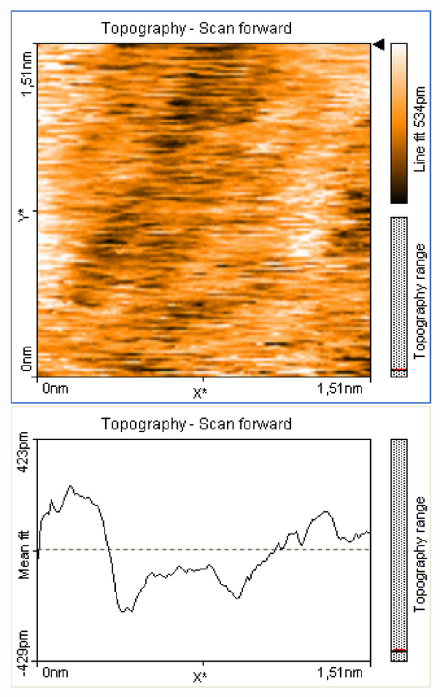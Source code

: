 \documentclass[12pt]{article}
\begin{document}
\begin{figure}[H]  
\begin{minipage}{0.4\linewidth}
\centering
\includegraphics[width=0.9\linewidth]{../plot/data/mos2/mos22.eps}
\end{minipage}
\begin{minipage}{0.2\linewidth}
\centering
\end{minipage}
\begin{minipage}{0.4\linewidth}
\centering

\end{minipage}
\end{figure}
\end{document}

